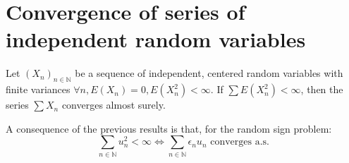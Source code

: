 \section{Convergence of series of independent random variables}%
\begin{theorem}
Let $(X_n)_{n \in \mathbb{N}}$ be a sequence of independent, centered random variables with finite variances $\forall n, E(X_n)=0, E(X_n^2) < \infty$.
If $\sum E(X_n^2) < \infty$, then the series $\sum X_n$ converges almost surely.
\end{theorem}%
A consequence of the previous results is that, for the random sign problem:
\[ \sum_{n \in \mathbb{N}} u_n^2 < \infty \iff \sum_{n \in \mathbb{N}} \epsilon_n u_n \text{ converges a.s.} \]

